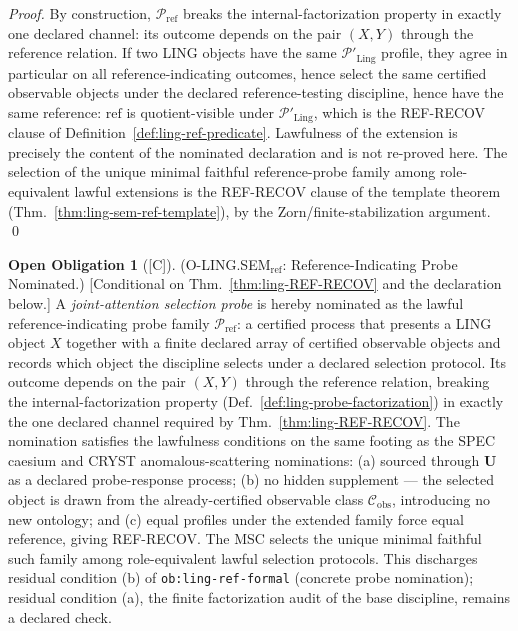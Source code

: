 \documentclass[12pt,oneside]{amsbook}
\theoremstyle{plain}
\theoremstyle{definition}
\newtheorem{obligation}[theorem]{Open Obligation}
\theoremstyle{remark}
\newcommand{\status}[1]{\textup{[#1]}}
\begin{document}
\begin{proof}
By construction, $\mathcal{P}_{\mathrm{ref}}$ breaks the
internal-factorization property in exactly one declared channel:
its outcome depends on the pair $(X, Y)$ through the reference
relation.  If two LING objects have the same
$\mathcal{P}'_{\mathrm{Ling}}$ profile, they agree in particular
on all reference-indicating outcomes, hence select the same
certified observable objects under the declared reference-testing
discipline, hence have the same reference: $\mathrm{ref}$ is
quotient-visible under $\mathcal{P}'_{\mathrm{Ling}}$, which is
the REF-RECOV clause of Definition~\ref{def:ling-ref-predicate}.
Lawfulness of the extension is precisely the content of the
nominated declaration and is not re-proved here.  The selection of
the unique minimal faithful reference-probe family among
role-equivalent lawful extensions is the REF-RECOV clause of the
template theorem (Thm.~\ref{thm:ling-sem-ref-template}), by the
Zorn/finite-stabilization argument.  \qed
\end{proof}

\begin{obligation}[\status{C}]\label{ob:ling-ref-probe-nomination}
\textup{(O-LING.SEM$_{\mathrm{ref}}$: Reference-Indicating Probe
Nominated.)}
\textup{[Conditional on Thm.~\ref{thm:ling-REF-RECOV} and the
declaration below.]}
A \emph{joint-attention selection probe} is hereby nominated as the
lawful reference-indicating probe family
$\mathcal{P}_{\mathrm{ref}}$: a certified process that presents a
LING object $X$ together with a finite declared array of certified
observable objects and records which object the discipline selects
under a declared selection protocol.  Its outcome depends on the
pair $(X, Y)$ through the reference relation, breaking the
internal-factorization property
(Def.~\ref{def:ling-probe-factorization}) in exactly the one
declared channel required by Thm.~\ref{thm:ling-REF-RECOV}.  The
nomination satisfies the lawfulness conditions on the same footing
as the SPEC caesium and CRYST anomalous-scattering nominations:
(a) sourced through $\mathbf{U}$ as a declared probe-response
process; (b) no hidden supplement --- the selected object is drawn
from the already-certified observable class
$\mathcal{C}_{\mathrm{obs}}$, introducing no new ontology; and
(c) equal profiles under the extended family force equal reference,
giving REF-RECOV.  The MSC selects the unique minimal faithful such
family among role-equivalent lawful selection protocols.  This
discharges residual condition (b) of \texttt{ob:ling-ref-formal}
(concrete probe nomination); residual condition (a), the
finite factorization audit of the base discipline, remains a
declared check.
\end{obligation}
\end{document}
